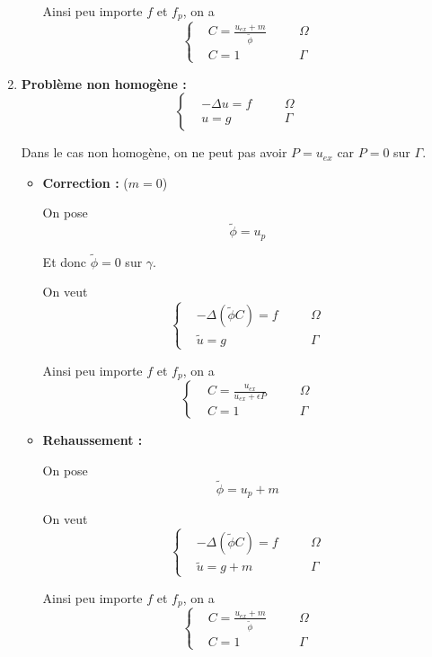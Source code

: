 \begin{enumerate}[label=\textbullet]
\begin{itemize}
		Ainsi peu importe $f$ et $f_p$, on a 
		$$\left\{\begin{aligned}
			&C=\frac{u_{ex}+m}{\tilde{\phi}} \quad &&\Omega \\
			&C=1 \quad &&\Gamma
		\end{aligned}\right.$$
	
	\end{itemize}
	
	\item \textbf{Problème non homogène :}
	$$\left\{\begin{aligned}
		&-\Delta u=f \quad &&\Omega \\
		&u=g \quad &&\Gamma
	\end{aligned}\right.$$

	\begin{Rem}
		Dans le cas non homogène, on ne peut pas avoir $P=u_{ex}$ car $P=0$ sur $\Gamma$.
	\end{Rem}
	

	\begin{itemize}
		\item \textbf{Correction :} ($m=0$)
		
		On pose
		$$\tilde{\phi}=u_p$$
		
		Et donc $\tilde{\phi}=0$ sur $\gamma$.
		
		On veut 
		$$\left\{\begin{aligned}
			&-\Delta(\tilde{\phi}C)=f \quad &&\Omega \\
			&\tilde{u}=g \quad &&\Gamma
		\end{aligned}\right.$$
	
		Ainsi peu importe $f$ et $f_p$, on a 
		$$\left\{\begin{aligned}
			&C=\frac{u_{ex}}{u_{ex}+\epsilon P} \quad &&\Omega \\
			&C=1 \quad &&\Gamma
		\end{aligned}\right.$$
		
		\item \textbf{Rehaussement :}
		
		On pose
		$$\tilde{\phi}=u_p+m$$
		
		On veut 
		$$\left\{\begin{aligned}
			&-\Delta(\tilde{\phi}C)=f \quad &&\Omega \\
			&\tilde{u}=g+m \quad &&\Gamma
		\end{aligned}\right.$$
		
		Ainsi peu importe $f$ et $f_p$, on a 
		$$\left\{\begin{aligned}
			&C=\frac{u_{ex}+m}{\tilde{\phi}} \quad &&\Omega \\
			&C=1 \quad &&\Gamma
		\end{aligned}\right.$$
	\end{itemize}

\end{enumerate}

